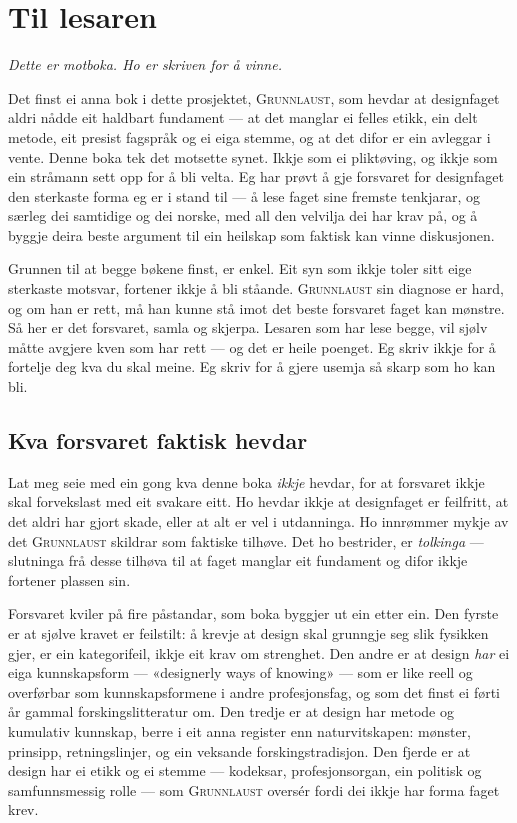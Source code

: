 \chapter*{Til lesaren}

\begin{center}\itshape
Dette er motboka. Ho er skriven for å vinne.
\end{center}
\vspace{8mm}

Det finst ei anna bok i dette prosjektet, \textsc{Grunnlaust}, som hevdar at designfaget aldri nådde eit haldbart fundament — at det manglar ei felles etikk, ein delt metode, eit presist fagspråk og ei eiga stemme, og at det difor er ein avleggar i vente. Denne boka tek det motsette synet. Ikkje som ei pliktøving, og ikkje som ein stråmann sett opp for å bli velta. Eg har prøvt å gje forsvaret for designfaget den sterkaste forma eg er i stand til — å lese faget sine fremste tenkjarar, og særleg dei samtidige og dei norske, med all den velvilja dei har krav på, og å byggje deira beste argument til ein heilskap som faktisk kan vinne diskusjonen.

Grunnen til at begge bøkene finst, er enkel. Eit syn som ikkje toler sitt eige sterkaste motsvar, fortener ikkje å bli ståande. \textsc{Grunnlaust} sin diagnose er hard, og om han er rett, må han kunne stå imot det beste forsvaret faget kan mønstre. Så her er det forsvaret, samla og skjerpa. Lesaren som har lese begge, vil sjølv måtte avgjere kven som har rett — og det er heile poenget. Eg skriv ikkje for å fortelje deg kva du skal meine. Eg skriv for å gjere usemja så skarp som ho kan bli.

\section{Kva forsvaret faktisk hevdar}

Lat meg seie med ein gong kva denne boka \emph{ikkje} hevdar, for at forsvaret ikkje skal forvekslast med eit svakare eitt. Ho hevdar ikkje at designfaget er feilfritt, at det aldri har gjort skade, eller at alt er vel i utdanninga. Ho innrømmer mykje av det \textsc{Grunnlaust} skildrar som faktiske tilhøve. Det ho bestrider, er \emph{tolkinga} — slutninga frå desse tilhøva til at faget manglar eit fundament og difor ikkje fortener plassen sin.

Forsvaret kviler på fire påstandar, som boka byggjer ut ein etter ein. Den fyrste er at sjølve kravet er feilstilt: å krevje at design skal grunngje seg slik fysikken gjer, er ein kategorifeil, ikkje eit krav om strenghet. Den andre er at design \emph{har} ei eiga kunnskapsform — «designerly ways of knowing» — som er like reell og overførbar som kunnskapsformene i andre profesjonsfag, og som det finst ei førti år gammal forskingslitteratur om. Den tredje er at design har metode og kumulativ kunnskap, berre i eit anna register enn naturvitskapen: mønster, prinsipp, retningslinjer, og ein veksande forskingstradisjon. Den fjerde er at design har ei etikk og ei stemme — kodeksar, profesjonsorgan, ein politisk og samfunnsmessig rolle — som \textsc{Grunnlaust} oversér fordi dei ikkje har forma faget krev.

